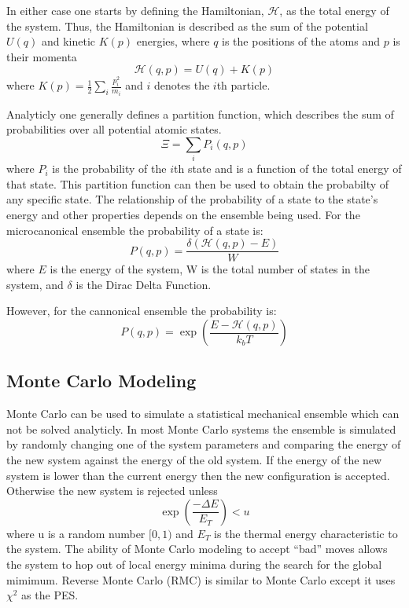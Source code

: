 In either case one starts by defining the Hamiltonian, $\mathcal{H}$, as the total energy of the system.
Thus, the Hamiltonian is described as the sum of the potential $U(q)$ and kinetic $K(p)$ energies, where $q$ is the positions of the atoms and $p$ is their momenta
\begin{equation} \label{Hamiltonian}
  \mathcal{H}(q, p) = U(q) + K(p)
\end{equation}
\noindent where $K(p) = \frac{1}{2}\sum_{i} \frac{p_{i}^{2}}{m_{i}}$ and $i$ denotes the $i$th particle.

Analyticly one generally defines a partition function, which describes the sum of probabilities over all potential atomic states.
\[
\Xi = \sum_{i} P_{i}(q, p)
\]
where $P_{i}$ is the probability of the $i$th state and is a function of the total energy of that state.
This partition function can then be used to obtain the probabilty of any specific state.
The relationship of the probability of a state to the state's energy and other properties depends on the ensemble being used.
For the microcanonical ensemble the probability of a state is:
\begin{equation}
P(q, p) = \frac{\delta(\mathcal{H}(q, p) - E)}{W}
\end{equation}
where $E$ is the energy of the system, W is the total number of states in the system, and $\delta$ is the Dirac Delta Function.

However, for the cannonical ensemble the probability is:
\begin{equation}
P(q, p) = \exp(\frac{E-\mathcal{H}(q, p)}{k_{b}T})
\end{equation}

\subsection{Monte Carlo Modeling}
Monte Carlo can be used to simulate a statistical mechanical ensemble which can not be solved analyticly.
In most Monte Carlo systems the ensemble is simulated by randomly changing one of the system parameters and comparing the energy of the new system against the energy of the old system.
If the energy of the new system is lower than the current energy then the new configuration is accepted.
Otherwise the new system is rejected unless
\[
\exp(\frac{-\Delta E}{E_{T}}) < u
\]
where u is a random number $[0, 1)$ and $E_{T}$ is the thermal energy characteristic to the system.
The ability of Monte Carlo modeling to accept ``bad'' moves allows the system to hop out of local energy minima during the search for the global mimimum.
Reverse Monte Carlo (RMC) is similar to Monte Carlo except it uses $\chi^{2}$ as the PES.\cite{McGreevy}

